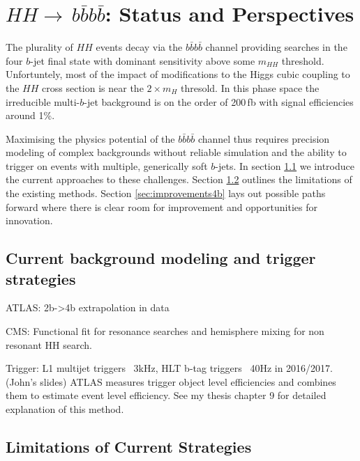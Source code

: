 \newcommand*{\ifb}{fb$^{-1}$\xspace}
\newcommand*{\smhh}{SM $HH$\xspace}
\newcommand*{\bbbb}{$b\bar{b}b\bar{b}$\xspace}
\newcommand*{\hh}{$HH$\xspace}
\newcommand*{\bjet}{$b$-jet\xspace}
\newcommand*{\bjets}{$b$-jets\xspace}
\newcommand*{\mhh}{$m_{HH}$\xspace}
\newcommand*{\mh}{$m_{H}$\xspace}

\section{$HH\to\,$\bbbb: Status and Perspectives}
\label{sec:HH4b}
The plurality of \hh events decay via the \bbbb channel providing searches in the four \bjet final state with dominant sensitivity above some \mhh threshold.
Unfortuntely, most of the impact of modifications to the Higgs cubic coupling to the \hh cross section is near the $2\times$\mh thresold.
In this phase space the irreducible multi-\bjet background is on the order of 200$\,$fb with signal efficiencies around 1\%.

Maximising the physics potential of the \bbbb channel thus requires precision modeling of complex backgrounds without reliable simulation
and the ability to trigger on events with multiple, generically soft \bjets. In section \ref{sec:current4b} we introduce the current
approaches to these challenges. Section \ref{sec:limitations4b} outlines the limitations of the existing methods. Section \ref{sec:improvements4b}
lays out possible paths forward where there is clear room for improvement and opportunities for innovation. 

\subsection{Current background modeling and trigger strategies}
\label{sec:current4b}

ATLAS: 2b->4b extrapolation in data

CMS: Functional fit for resonance searches and hemisphere mixing for non resonant HH search.

Trigger: L1 multijet triggers ~3kHz, HLT b-tag triggers ~40Hz in 2016/2017. (John’s slides) ATLAS measures trigger object level efficiencies and combines them to estimate event level efficiency. See my thesis chapter 9 for detailed explanation of this method.

\subsection{Limitations of Current Strategies}
\label{sec:limitations4b}

